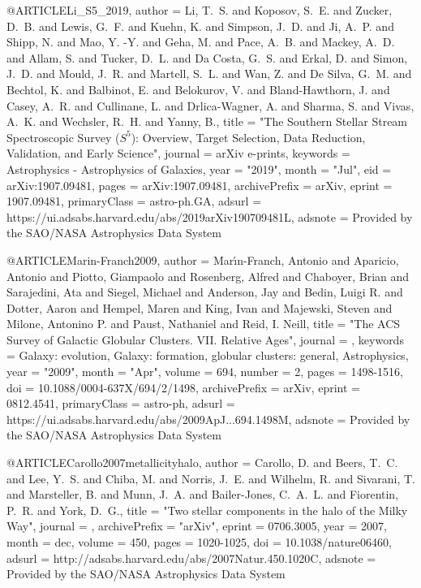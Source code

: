 \documentclass[apj]{emulateapj}
\begin{document}
{{@ARTICLE{Li_S5_2019,
       author = {{Li}, T.~S. and {Koposov}, S.~E. and {Zucker}, D.~B. and {Lewis}, G.~F. and
         {Kuehn}, K. and {Simpson}, J.~D. and {Ji}, A.~P. and {Shipp}, N. and
         {Mao}, Y. -Y. and {Geha}, M. and {Pace}, A.~B. and {Mackey}, A.~D. and
         {Allam}, S. and {Tucker}, D.~L. and {Da Costa}, G.~S. and {Erkal}, D. and
         {Simon}, J.~D. and {Mould}, J.~R. and {Martell}, S.~L. and {Wan}, Z. and
         {De Silva}, G.~M. and {Bechtol}, K. and {Balbinot}, E. and
         {Belokurov}, V. and {Bland-Hawthorn}, J. and {Casey}, A.~R. and
         {Cullinane}, L. and {Drlica-Wagner}, A. and {Sharma}, S. and
         {Vivas}, A.~K. and {Wechsler}, R.~H. and {Yanny}, B.},
        title = "{The Southern Stellar Stream Spectroscopic Survey (${S}^5$): Overview, Target Selection, Data Reduction, Validation, and Early Science}",
      journal = {arXiv e-prints},
     keywords = {Astrophysics - Astrophysics of Galaxies},
         year = "2019",
        month = "Jul",
          eid = {arXiv:1907.09481},
        pages = {arXiv:1907.09481},
archivePrefix = {arXiv},
       eprint = {1907.09481},
 primaryClass = {astro-ph.GA},
       adsurl = {https://ui.adsabs.harvard.edu/abs/2019arXiv190709481L},
      adsnote = {Provided by the SAO/NASA Astrophysics Data System}
}



@ARTICLE{Marin-Franch2009,
       author = {{Mar{\'\i}n-Franch}, Antonio and {Aparicio}, Antonio and
         {Piotto}, Giampaolo and {Rosenberg}, Alfred and {Chaboyer}, Brian and
         {Sarajedini}, Ata and {Siegel}, Michael and {Anderson}, Jay and
         {Bedin}, Luigi R. and {Dotter}, Aaron and {Hempel}, Maren and
         {King}, Ivan and {Majewski}, Steven and {Milone}, Antonino P. and
         {Paust}, Nathaniel and {Reid}, I. Neill},
        title = "{The ACS Survey of Galactic Globular Clusters. VII. Relative Ages}",
      journal = {\apj},
     keywords = {Galaxy: evolution, Galaxy: formation, globular clusters: general, Astrophysics},
         year = "2009",
        month = "Apr",
       volume = {694},
       number = {2},
        pages = {1498-1516},
          doi = {10.1088/0004-637X/694/2/1498},
archivePrefix = {arXiv},
       eprint = {0812.4541},
 primaryClass = {astro-ph},
       adsurl = {https://ui.adsabs.harvard.edu/abs/2009ApJ...694.1498M},
      adsnote = {Provided by the SAO/NASA Astrophysics Data System}
}




@ARTICLE{Carollo2007metallicityhalo,
   author = {{Carollo}, D. and {Beers}, T.~C. and {Lee}, Y.~S. and {Chiba}, M. and 
	{Norris}, J.~E. and {Wilhelm}, R. and {Sivarani}, T. and {Marsteller}, B. and 
	{Munn}, J.~A. and {Bailer-Jones}, C.~A.~L. and {Fiorentin}, P.~R. and 
	{York}, D.~G.},
    title = "{Two stellar components in the halo of the Milky Way}",
  journal = {\nat},
archivePrefix = "arXiv",
   eprint = {0706.3005},
     year = 2007,
    month = dec,
   volume = 450,
    pages = {1020-1025},
      doi = {10.1038/nature06460},
   adsurl = {http://adsabs.harvard.edu/abs/2007Natur.450.1020C},
  adsnote = {Provided by the SAO/NASA Astrophysics Data System}
}


}}
\end{document}

